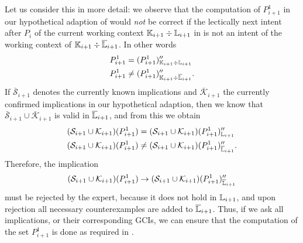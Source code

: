 Let us consider this in more detail: we observe that the computation of $P_{i+1}^{1}$ in
our hypothetical adaption of  would
\emph{not} be correct if the lectically next intent after $P_{i}$ of the current working
context ${\mathbb{K}}_{i+1} \div {\ensuremath{\mathbb{L}}}_{i+1}$ in 
is not an intent of the working context of ${\mathbb{K}}_{i+1} \div \overline{{\mathbb{L}}}_{i+1}$.  In
other words
\begin{align*}
  P_{i+1}^{1} &= (P_{i+1}^{1})_{{\mathbb{K}}_{i+1} \div {\ensuremath{\mathbb{L}}}_{i+1}}''\\
  P_{i+1}^{1} &\neq (P_{i+1}^{1})_{{\mathbb{K}}_{i+1} \div \overline{{\mathbb{L}}}_{i+1}}''.
\end{align*}
If $\bar{\mathcal{S}}_{i+1}$ denotes the currently known implications and
$\bar{\mathcal{K}}_{i+1}$ the currently confirmed implications in our hypothetical
adaption, then we know that $\bar{\mathcal{S}}_{i+1} \cup \bar{\mathcal{K}}_{i+1}$ is
valid in $\overline{{\mathbb{L}}}_{i+1}$, and from this we obtain
\begin{align*}
  (\mathcal{S}_{i+1} \cup \mathcal{K}_{i+1})(P_{i+1}^{1})
  &= (\mathcal{S}_{i+1} \cup \mathcal{K}_{i+1})(P_{i+1}^{1})_{{\mathbb{L}}_{i+1}}''\\
  (\mathcal{S}_{i+1} \cup \mathcal{K}_{i+1})(P_{i+1}^{1})
  &\neq (\mathcal{S}_{i+1} \cup \mathcal{K}_{i+1})(P_{i+1}^{1})_{\overline{{\mathbb{L}}}_{i+1}}''.
\end{align*}
Therefore, the implication
\begin{equation*}
  (\mathcal{S}_{i+1} \cup \mathcal{K}_{i+1})(P_{i+1}^{1}) \to
  (\mathcal{S}_{i+1} \cup \mathcal{K}_{i+1})(P_{i+1}^{1})_{\overline{{\mathbb{L}}}_{i+1}}''
\end{equation*}
must be rejected by the expert, because it does not hold in ${\mathbb{L}}_{i+1}$, and upon
rejection all necessary counterexamples are added to $\overline{{\mathbb{L}}}_{i+1}$.  Thus, if we
ask all implications, or their corresponding GCIs, we can ensure that the computation of
the set $P_{i+1}^{1}$ is done as required in
.


